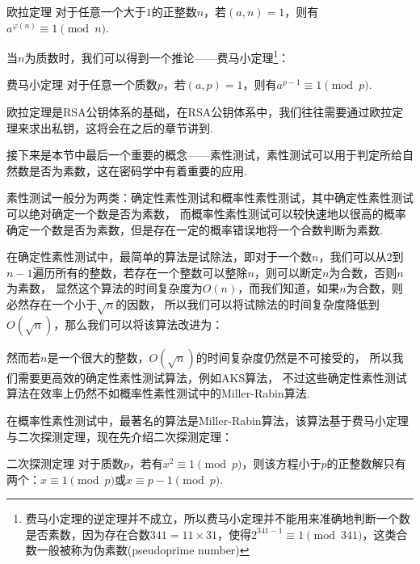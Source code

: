 \documentclass{book}
\numberwithin{equation}{subsubsection}
\begin{document}
\begin{concept}{欧拉定理}
对于任意一个大于$1$的正整数$n$，若$(a,n)=1$，则有$a^{\varphi(n)}\equiv 1\pmod{n}$.\par
\end{concept}

当$n$为质数时，我们可以得到一个推论——费马小定理\footnote{费马小定理的逆定理并不成立，所以费马小定理并不能用来准确地判断一个数是否素数，因为存在合数$341=11\times31$，使得$2^{341-1}\equiv 1\pmod{341}$，这类合数一般被称为伪素数(pseudoprime number)}：

\begin{concept}{费马小定理}
对于任意一个质数$p$，若$(a,p)=1$，则有$a^{p-1}\equiv 1\pmod{p}$.\par
\end{concept}

欧拉定理是RSA公钥体系的基础，在RSA公钥体系中，我们往往需要通过欧拉定理来求出私钥，这将会在之后的章节讲到.\par
接下来是本节中最后一个重要的概念——素性测试，素性测试可以用于判定所给自然数是否为素数，这在密码学中有着重要的应用.\par
素性测试一般分为两类：确定性素性测试和概率性素性测试，其中确定性素性测试可以绝对确定一个数是否为素数，
而概率性素性测试可以较快速地以很高的概率确定一个数是否为素数，但是存在一定的概率错误地将一个合数判断为素数.\par
在确定性素性测试中，最简单的算法是试除法，即对于一个数$n$，我们可以从$2$到$n-1$遍历所有的整数，若存在一个整数可以整除$n$，则可以断定$n$为合数，否则$n$为素数，
显然这个算法的时间复杂度为$O(n)$，而我们知道，如果$n$为合数，则必然存在一个小于$\sqrt{n}$的因数，
所以我们可以将试除法的时间复杂度降低到$O(\sqrt{n})$，那么我们可以将该算法改进为：
\begin{algorithm}
    \caption{试除法$\text{isPrime}(n)$}
\end{algorithm}\par
然而若$n$是一个很大的整数，$O(\sqrt{n})$的时间复杂度仍然是不可接受的，
所以我们需要更高效的确定性素性测试算法，例如AKS算法，
不过这些确定性素性测试算法在效率上仍然不如概率性素性测试中的Miller-Rabin算法.\par
在概率性素性测试中，最著名的算法是Miller-Rabin算法，该算法基于费马小定理与二次探测定理，现在先介绍二次探测定理：

\begin{concept}{二次探测定理}
对于质数$p$，若有$x^2\equiv 1\pmod{p}$，则该方程小于$p$的正整数解只有两个：$x\equiv 1\pmod{p}$或$x\equiv p-1\pmod{p}$.\par
\end{concept}
\end{document}
